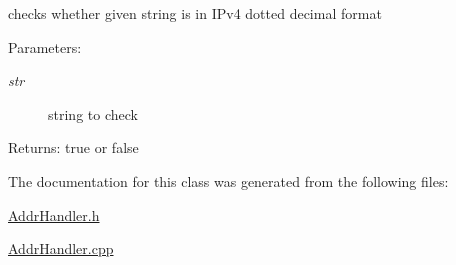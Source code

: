 checks whether given string is in IPv4 dotted decimal format 

\begin{Desc}
\item[Parameters:]
\begin{description}
\item[{\em str}]string to check \end{description}
\end{Desc}
\begin{Desc}
\item[Returns:]true or false \end{Desc}


The documentation for this class was generated from the following files:\begin{CompactItemize}
\item 
\hyperlink{AddrHandler_8h}{AddrHandler.h}\item 
\hyperlink{AddrHandler_8cpp}{AddrHandler.cpp}\end{CompactItemize}
